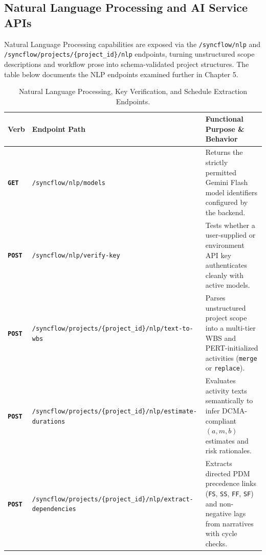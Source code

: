 \vspace{4mm}

\subsection{Natural Language Processing and AI Service APIs}
Natural Language Processing capabilities are exposed via the \texttt{/syncflow/nlp} and \texttt{/syncflow/\allowbreak projects/\allowbreak \{project\_id\}/\allowbreak nlp} endpoints, turning unstructured scope descriptions and workflow prose into schema-validated project structures. The table below documents the NLP endpoints examined further in Chapter 5.

\begin{table}[H]
\centering
\footnotesize
\setlength{\tabcolsep}{5pt}
\renewcommand{\arraystretch}{1.28}
\caption*{Natural Language Processing, Key Verification, and Schedule Extraction Endpoints.}
\vspace{-2pt}
\begin{tabularx}{\textwidth}{p{1.3cm} >{\raggedright\arraybackslash}p{6.0cm} X}
\toprule
\textbf{Verb} & \textbf{Endpoint Path} & \textbf{Functional Purpose \& Behavior} \\
\midrule
\textbf{\texttt{GET}} & \texttt{/syncflow/nlp/models} & Returns the strictly permitted Gemini Flash model identifiers configured by the backend. \\
\textbf{\texttt{POST}} & \texttt{/syncflow/nlp/verify-key} & Tests whether a user-supplied or environment API key authenticates cleanly with active models. \\
\textbf{\texttt{POST}} & \texttt{/syncflow/projects/\{project\_id\}/\allowbreak nlp/text-to-wbs} & Parses unstructured project scope into a multi-tier WBS and PERT-initialized activities (\texttt{merge} or \texttt{replace}). \\
\textbf{\texttt{POST}} & \texttt{/syncflow/projects/\{project\_id\}/\allowbreak nlp/estimate-durations} & Evaluates activity texts semantically to infer DCMA-compliant $(a, m, b)$ estimates and risk rationales. \\
\textbf{\texttt{POST}} & \texttt{/syncflow/projects/\{project\_id\}/\allowbreak nlp/extract-dependencies} & Extracts directed PDM precedence links (\texttt{FS}, \texttt{SS}, \texttt{FF}, \texttt{SF}) and non-negative lags from narratives with cycle checks. \\
\bottomrule
\end{tabularx}
\end{table}

